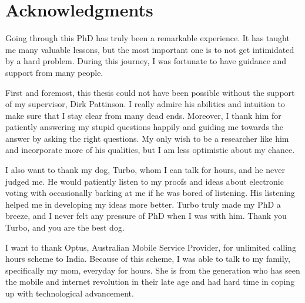 \chapter*{Acknowledgments}
\setlength{\parindent}{2em}
\setlength{\parskip}{1em}
Going through this PhD has truly been a remarkable experience.  It has taught me many valuable lessons, 
but the most important one is to not get intimidated by a hard problem.  During this journey, I 
was fortunate to have guidance and support from many people. 	


First and foremost, this thesis could not have been possible without the support of my supervisor, Dirk Pattinson. I really 
admire his abilities and intuition to make sure that I stay clear from many dead ends. Moreover, 
I thank him for patiently answering my stupid questions happily and guiding me towards the
answer by asking the right questions. My only wish to be a researcher like 
him and incorporate more of his qualities, but I am less optimistic about my chance. 

I also want to thank my dog, Turbo, whom I can talk for hours, and he never judged me. He 
would patiently listen to my proofs
and ideas about electronic voting with occasionally barking at me if he was bored of listening. 
His listening helped me in developing my ideas more better. 
Turbo truly made my PhD a breeze, and I never felt any pressure of PhD when I was with him. Thank you
Turbo, and you are the best dog. 


I want to thank Optus, Australian Mobile Service Provider, for unlimited calling hours scheme to India. 
Because of this scheme, I was able to talk to my family, specifically my mom, everyday for hours. She is from the generation 
who has seen the mobile and internet revolution in their late age and had hard time in coping up with
technological advancement. 
 
